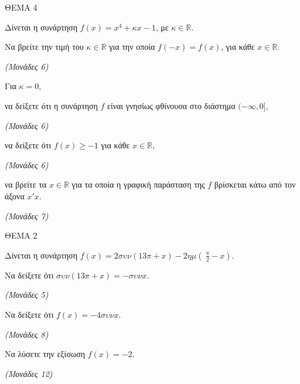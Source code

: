 \documentclass[11pt,a4paper,twoside]{book}
\newcommand{\monades}[1]{\hfill \textit{(Μονάδες #1)}}
\begin{document}
\vspace{4mm}

ΘΕΜΑ 4

Δίνεται η συνάρτηση $f(x) = x^{4} + \kappa x - 1$, με $\kappa\mathbb{\in R}$.

\begin{alist}
\item Να βρείτε την τιμή του $\kappa\mathbb{\in R}$ για την οποία $f( - x) = f(x)$, για κάθε $x\mathbb{\in R}$.

\monades{6}

\item Για $\kappa = 0,$

\end{alist}
\begin{alist}
\item
  να δείξετε ότι η συνάρτηση $f$ είναι γνησίως φθίνουσα στο διάστημα $( - \infty,0\rbrack$,

\monades{6}


\end{alist}
\begin{alist}
\item
  να δείξετε ότι $f(x) \geq - 1$ για κάθε $x \in \mathbb{R}$,

\monades{6}


\end{alist}
\begin{alist}
\item
  να βρείτε τα $x\mathbb{\in R}$ για τα οποία η γραφική παράσταση της $f$ βρίσκεται κάτω από τον άξονα $x'x$.

\monades{7}
\end{alist}

\vspace{4mm}

ΘΕΜΑ 2

Δίνεται η συνάρτηση $f(x) = 2\sigma\upsilon\nu(13\pi + x) - 2\eta\mu(\ \frac{\pi}{2} - x).$

\begin{alist}
\item Να δείξετε ότι $\sigma\upsilon\nu(13\pi + x) = - \sigma\upsilon\nu x$.

\monades{5}

\item Να δείξετε ότι $f(x) = - 4\sigma\upsilon\nu x$.

\monades{8}

\item Να λύσετε την εξίσωση $f(x) = - 2$.

\monades{12}
\end{alist}
\end{document}
